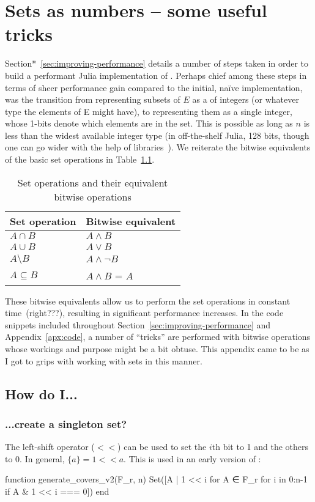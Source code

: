 \chapter{Sets as numbers -- some useful tricks}
Section*~\ref{sec:improving-performance} details a number of steps taken in order to build a performant Julia implementation of . Perhaps chief among these steps in terms of sheer performance gain compared to the initial, naïve implementation, was the transition from representing subsets of $E$ as a  of integers (or whatever type the elements of E might have), to representing them as a single integer, whose 1-bits denote which elements are in the set. This is possible as long as $n$ is less than the widest available integer type (in off-the-shelf Julia, 128 bits, though one can go wider with the help of libraries~\cite{BitIntegers.jl}). We reiterate the bitwise equivalents of the basic set operations in Table~\ref{tab:equiv-bitwise}.
\begin{table}[!ht]
  \caption{Set operations and their equivalent bitwise operations}
  \label{tab:equiv-bitwise}
  \centering
  \begin{tabular}{|l|l|}
  \hline
      Set operation   & Bitwise equivalent   \\\hline
      $A \cap B$      & $A \land B$       \\\hline
      $A \cup B$      & $A \lor B$        \\\hline
      $A \setminus B$ & $A \land \lnot B$   \\\hline
      $A \subseteq B$ & $A \land B$ = $A$ \\\hline
  \end{tabular}
\end{table}
These bitwise equivalents allow us to perform the set operations in constant time~(right???), resulting in significant performance increases. In the code snippets included throughout Section~\ref{sec:improving-performance} and Appendix~\ref{apx:code}, a number of ``tricks'' are performed with bitwise operations whose workings and purpose might be a bit obtuse. This appendix came to be as I got to grips with working with sets in this manner.

\section*{How do I...}
\subsection*{...create a singleton set?}
The left-shift operator ($<<$) can be used to set the $i$th bit to 1 and the others to 0. In general, $\{a\} = 1<<a$. This is used in an early version of :
\begin{jllisting}
function generate_covers_v2(F_r, n)
  Set([A | 1 << i for A ∈ F_r for i in 0:n-1 if A & 1 << i === 0])
end
\end{jllisting}

